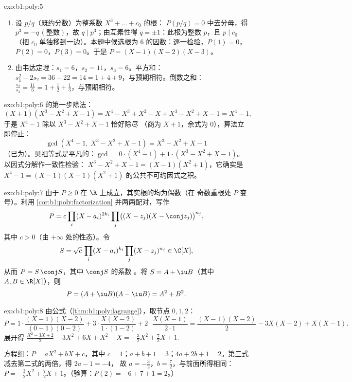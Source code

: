 \begin{solution}{exo:b1:poly:5}
\begin{enumerate}
  \item 设 $p/q$（既约分数）为整系数
        $X^3 + \dots + c_0$ 的根：
        $P(p/q) = 0$ 中去分母，得 $p^3 = -q\,(\text{整数})$，故 $q \mid
        p^3$；由互素性得 $q = \pm 1$：此根为整数
        $p$，且 $p \mid c_0$（把 $c_0$ 单独移到一边）。本题中候选根为
        $6$ 的因数：逐一检验，$P(1) = 0$，$P(2) = 0$，$P(3) = 0$。于是
        $P = (X-1)(X-2)(X-3)$。
  \item 由韦达定理：$s_1 = 6$，$s_2 = 11$，$s_3 = 6$。平方和：
        $s_1^2 - 2s_2 = 36 - 22 = 14 = 1 + 4 + 9$，与预期相符。倒数之和：
        $\frac{s_2}{s_3} = \frac{11}{6} = 1 + \frac12 + \frac13$，与预期相符。
\end{enumerate}
\end{solution}

\begin{solution}{exo:b1:poly:6}
的第一步除法：
\[
(X + 1)(X^3 - X^2 + X - 1)
= X^4 - X^3 + X^2 - X + X^3 - X^2 + X - 1 = X^4 - 1 ,
\]
于是 $X^4 - 1$ 除以 $X^3 - X^2 + X - 1$ 恰好除尽
（商为 $X + 1$，余式为 $0$），算法立即停止：
\[
\gcd(X^4 - 1,\; X^3 - X^2 + X - 1) = X^3 - X^2 + X - 1
\]
（已为）。贝祖等式是平凡的：$\gcd = 0
\cdot (X^4 - 1) + 1 \cdot (X^3 - X^2 + X - 1)$。以因式分解作一致性检验：
$X^3 - X^2 + X - 1 = (X - 1)(X^2 + 1)$，它确实是
$X^4 - 1 =
(X-1)(X+1)(X^2+1)$ 的公共不可约因式之积。
\end{solution}

\begin{solution}{exo:b1:poly:7}
由于 $P \geq 0$ 在 $\R$ 上成立，其实根的均为偶数（在
奇数重根处 $P$ 变号）。利用
\cref{cor:b1:poly:factorization} 并两两配对，写作
\[
P = c \prod_i (X - a_i)^{2k_i} \prod_j \bigl((X - z_j)(X - \conj
z_j)\bigr)^{n_j},
\]
其中 $c > 0$（由 $+\infty$ 处的性态）。令
\[
S = \sqrt c\, \prod_i (X - a_i)^{k_i} \prod_j (X - z_j)^{n_j}
\in \C[X],
\]
从而 $P = S\,\conj S$，其中 $\conj S$ 的系数
。将 $S = A + \iu B$（其中 $A, B \in \R[X]$），则
\[
P = (A + \iu B)(A - \iu B) = A^2 + B^2 .
\]
\end{solution}

\begin{solution}{exo:b1:poly:8}
由公式（\cref{thm:b1:poly:lagrange}），取节点 $0, 1, 2$：
\[
P = 1\cdot\frac{(X-1)(X-2)}{(0-1)(0-2)} + 3\cdot\frac{X(X-2)}{1\cdot(1-2)}
+ 2\cdot\frac{X(X-1)}{2\cdot 1}
= \frac{(X-1)(X-2)}{2} - 3X(X-2) + X(X-1).
\]
展开得 $\frac{X^2 - 3X + 2}{2} - 3X^2 + 6X + X^2 - X =
-\frac{3}{2}X^2 + \frac{7}{2}X + 1$.

方程组：$P = aX^2 + bX + c$，其中 $c = 1$；$a + b + 1 = 3$；$4a + 2b +
1 = 2$。第三式减去第二式的两倍，得 $2a - 1 = -4$，
故 $a = -\frac32$，$b = \frac72$，与前面所得相同：
$P = -\frac32 X^2 + \frac72 X + 1$。（验算：$P(2) = -6 + 7 + 1 = 2$。）
\end{solution}

